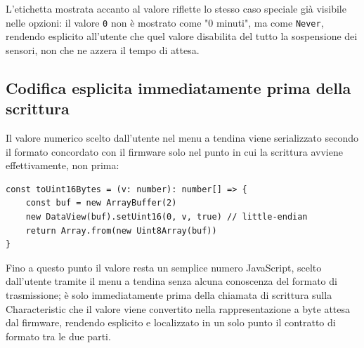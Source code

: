 L'etichetta mostrata accanto al valore riflette lo stesso caso speciale già
visibile nelle opzioni: il valore \texttt{0} non è mostrato come "0 minuti",
ma come \texttt{Never}, rendendo esplicito all'utente che quel valore
disabilita del tutto la sospensione dei sensori, non che ne azzera il tempo
di attesa.

\subsection{Codifica esplicita immediatamente prima della scrittura}
Il valore numerico scelto dall'utente nel menu a tendina viene serializzato
secondo il formato concordato con il firmware solo nel punto in cui la
scrittura avviene effettivamente, non prima:

\begin{listing}[H]
\begin{verbatim}
const toUint16Bytes = (v: number): number[] => {
    const buf = new ArrayBuffer(2)
    new DataView(buf).setUint16(0, v, true) // little-endian
    return Array.from(new Uint8Array(buf))
}
\end{verbatim}
\caption{Codifica del valore in un intero a 16 bit little-endian}
\label{listing:config-encode}
\end{listing}

Fino a questo punto il valore resta un semplice numero JavaScript, scelto
dall'utente tramite il menu a tendina senza alcuna conoscenza del formato di
trasmissione; è solo immediatamente prima della chiamata di scrittura sulla
Characteristic che il valore viene convertito nella rappresentazione a byte
attesa dal firmware, rendendo esplicito e localizzato in un solo punto il
contratto di formato tra le due parti.

\newpage